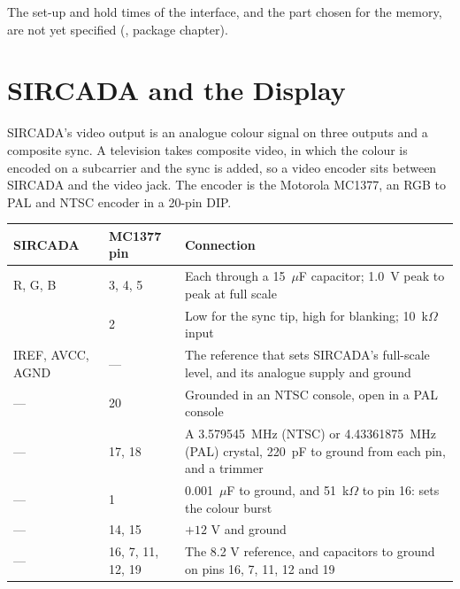 \noindent The set-up and hold times of the interface, and the part chosen for the memory, are not yet specified
(\videomanual{}, package chapter).

\section{SIRCADA and the Display}
\label{sec:display-wiring}

SIRCADA's video output is an analogue colour signal on three outputs and a composite sync. A television takes composite
video, in which the colour is encoded on a subcarrier and the sync is added, so a video encoder sits between SIRCADA
and the video jack. The encoder is the Motorola MC1377, an RGB to PAL and NTSC encoder in a 20-pin DIP.

\begin{table}[H]
	\centering
	\small
	\begin{tabular}{llp{6.6cm}}
		\toprule
		\textbf{SIRCADA}  & \textbf{MC1377 pin} & \textbf{Connection}                                                                                  \\
		\midrule
		R, G, B           & 3, 4, 5             & Each through a 15~$\mu$F capacitor; 1.0~V peak to peak at full scale                                 \\
		\activelow{CSYNC} & 2                   & Low for the sync tip, high for blanking; 10~k$\Omega$ input                                          \\
		IREF, AVCC, AGND  & ---                 & The reference that sets SIRCADA's full-scale level, and its analogue supply and ground               \\
		---               & 20                  & Grounded in an NTSC console, open in a PAL console                                                   \\
		---               & 17, 18              & A 3.579545~MHz (NTSC) or 4.43361875~MHz (PAL) crystal, 220~pF to ground from each pin, and a trimmer \\
		---               & 1                   & 0.001~$\mu$F to ground, and 51~k$\Omega$ to pin 16: sets the colour burst                            \\
		---               & 14, 15              & $+12$ V and ground                                                                                   \\
		---               & 16, 7, 11, 12, 19   & The 8.2 V reference, and capacitors to ground on pins 16, 7, 11, 12 and 19                           \\

\end{tabular}
\end{table}
